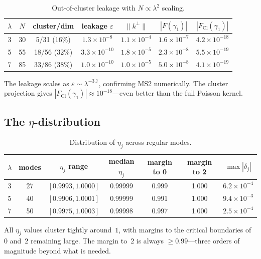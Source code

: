 \documentclass[12pt,a4paper]{article}
\theoremstyle{definition}
\theoremstyle{remark}
\newcommand{\Cl}{\mathrm{Cl}}
\newcommand{\norm}[1]{\| #1 \|}
\begin{document}
\begin{table}[h]
\centering
\caption{Out-of-cluster leakage with $N \propto \lambda^2$ scaling.}
\label{tab:leakage}
\begin{tabular}{ccccccc}
\toprule
$\lambda$ & $N$ & cluster/dim & leakage $\varepsilon$ &
  $\norm{k^\perp}$ & $|F({\gamma_1})|$ & $|F_{\Cl}(\gamma_1)|$ \\
\midrule
3 & 30 & 5/31 (16\%) & $1.3 \times 10^{-8}$ & $1.1 \times 10^{-4}$ &
  $1.6 \times 10^{-7}$ & $4.2 \times 10^{-18}$ \\
5 & 55 & 18/56 (32\%) & $3.3 \times 10^{-10}$ & $1.8 \times 10^{-5}$ &
  $2.3 \times 10^{-8}$ & $5.5 \times 10^{-19}$ \\
7 & 85 & 33/86 (38\%) & $1.0 \times 10^{-10}$ & $1.0 \times 10^{-5}$ &
  $5.0 \times 10^{-8}$ & $4.1 \times 10^{-19}$ \\
\bottomrule
\end{tabular}
\end{table}

The leakage scales as $\varepsilon \sim \lambda^{-3.7}$,
confirming MS2 numerically.
The cluster projection gives $|F_{\Cl}(\gamma_1)| \approx 10^{-18}$---even
better than the full Poisson kernel.

\subsection{The \texorpdfstring{$\eta$}{eta}-distribution}

\begin{table}[h]
\centering
\caption{Distribution of $\eta_j$ across regular modes.}
\label{tab:eta}
\begin{tabular}{ccccccc}
\toprule
$\lambda$ & modes & $\eta_j$ range & median $\eta_j$ &
  margin to 0 & margin to 2 & $\max|\delta_j|$ \\
\midrule
3 & 27 & $[0.9993, 1.0000]$ & 0.99999 & 0.999 & 1.000 &
  $6.2 \times 10^{-4}$ \\
5 & 40 & $[0.9906, 1.0001]$ & 0.99999 & 0.991 & 1.000 &
  $9.4 \times 10^{-3}$ \\
7 & 50 & $[0.9975, 1.0003]$ & 0.99998 & 0.997 & 1.000 &
  $2.5 \times 10^{-4}$ \\
\bottomrule
\end{tabular}
\end{table}

All $\eta_j$ values cluster tightly around~$1$, with margins to
the critical boundaries of~$0$ and~$2$ remaining large.
The margin to~$2$ is always $\geq 0.99$---three orders of magnitude
beyond what is needed.
\end{document}
